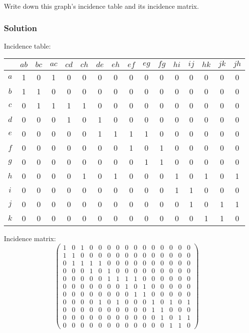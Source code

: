 \documentclass[12pt]{article}
\begin{document}
Write down this graph's incidence table and its incidence matrix.

\subsubsection*{Solution}

Incidence table:

\begin{tabular}{c | *{15}{c}}
	& $ab$ & $bc$ & $ac$ & $cd$ & $ch$ & $de$ & $eh$ & $ef$ & $eg$ & $fg$ & $hi$ & $ij$ & $hk$ & $jk$ & $jh$ \\
	\hline
	$a$ & 1 & 0 & 1 & 0 & 0 & 0 & 0 & 0 & 0 & 0 & 0 & 0 & 0 & 0 & 0 \\
	$b$ & 1 & 1 & 0 & 0 & 0 & 0 & 0 & 0 & 0 & 0 & 0 & 0 & 0 & 0 & 0 \\
	$c$ & 0 & 1 & 1 & 1 & 1 & 0 & 0 & 0 & 0 & 0 & 0 & 0 & 0 & 0 & 0 \\
	$d$ & 0 & 0 & 0 & 1 & 0 & 1 & 0 & 0 & 0 & 0 & 0 & 0 & 0 & 0 & 0 \\
	$e$ & 0 & 0 & 0 & 0 & 0 & 1 & 1 & 1 & 1 & 0 & 0 & 0 & 0 & 0 & 0 \\
	$f$ & 0 & 0 & 0 & 0 & 0 & 0 & 0 & 1 & 0 & 1 & 0 & 0 & 0 & 0 & 0 \\
	$g$ & 0 & 0 & 0 & 0 & 0 & 0 & 0 & 0 & 1 & 1 & 0 & 0 & 0 & 0 & 0 \\
	$h$ & 0 & 0 & 0 & 0 & 1 & 0 & 1 & 0 & 0 & 0 & 1 & 0 & 1 & 0 & 1 \\
	$i$ & 0 & 0 & 0 & 0 & 0 & 0 & 0 & 0 & 0 & 0 & 1 & 1 & 0 & 0 & 0 \\
	$j$ & 0 & 0 & 0 & 0 & 0 & 0 & 0 & 0 & 0 & 0 & 0 & 1 & 0 & 1 & 1 \\
	$k$ & 0 & 0 & 0 & 0 & 0 & 0 & 0 & 0 & 0 & 0 & 0 & 0 & 1 & 1 & 0
\end{tabular}

\bigskip
Incidence matrix:
\[
\begin{pmatrix}
	1 & 0 & 1 & 0 & 0 & 0 & 0 & 0 & 0 & 0 & 0 & 0 & 0 & 0 & 0 \\
	1 & 1 & 0 & 0 & 0 & 0 & 0 & 0 & 0 & 0 & 0 & 0 & 0 & 0 & 0 \\
	0 & 1 & 1 & 1 & 1 & 0 & 0 & 0 & 0 & 0 & 0 & 0 & 0 & 0 & 0 \\
	0 & 0 & 0 & 1 & 0 & 1 & 0 & 0 & 0 & 0 & 0 & 0 & 0 & 0 & 0 \\
	0 & 0 & 0 & 0 & 0 & 1 & 1 & 1 & 1 & 0 & 0 & 0 & 0 & 0 & 0 \\
	0 & 0 & 0 & 0 & 0 & 0 & 0 & 1 & 0 & 1 & 0 & 0 & 0 & 0 & 0 \\
	0 & 0 & 0 & 0 & 0 & 0 & 0 & 0 & 1 & 1 & 0 & 0 & 0 & 0 & 0 \\
	0 & 0 & 0 & 0 & 1 & 0 & 1 & 0 & 0 & 0 & 1 & 0 & 1 & 0 & 1 \\
	0 & 0 & 0 & 0 & 0 & 0 & 0 & 0 & 0 & 0 & 1 & 1 & 0 & 0 & 0 \\
	0 & 0 & 0 & 0 & 0 & 0 & 0 & 0 & 0 & 0 & 0 & 1 & 0 & 1 & 1 \\
	0 & 0 & 0 & 0 & 0 & 0 & 0 & 0 & 0 & 0 & 0 & 0 & 1 & 1 & 0
\end{pmatrix}
\]
\end{document}
